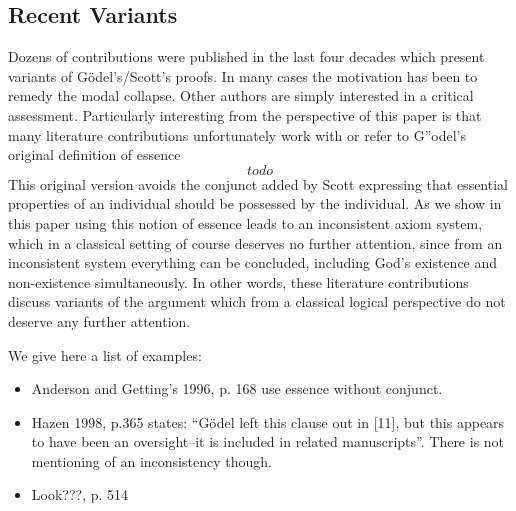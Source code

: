 \documentclass{article}
\begin{document}
\subsection{Recent Variants}
Dozens of contributions were published in the last four decades which
present variants of G\"odel's/Scott's proofs. In many cases the
motivation has been to remedy the modal collapse. Other authors are
simply interested in a critical assessment. Particularly interesting
from the perspective of this paper is that many literature
contributions unfortunately work with or refer to G''odel's original
definition of essence
$$ todo $$
This original version avoids the conjunct added by Scott expressing
that essential properties of an individual should be possessed by the
individual. As we show in this paper using this notion of essence
leads to an inconsistent axiom system, which in a classical setting of
course deserves no further attention, since from an inconsistent
system everything can be concluded, including God's existence and
non-existence simultaneously. In other words, these literature
contributions discuss variants of the argument which from a classical
logical perspective do not deserve any further attention.

We give here a list of examples:
\begin{itemize}
\item Anderson and Getting's 1996, p. 168 \cite[p.168]{AndersonGettings1968}
  use essence without conjunct.
\item  Hazen 1998, p.365 \cite[p.365]{Hazen1998} states: ``G\"odel left this
  clause out in [11], but this appears to have been an oversight--it
  is included in related manuscripts''. There is not mentioning of an
  inconsistency though.
\item Look???, p. 514

\end{itemize}
\end{document}
